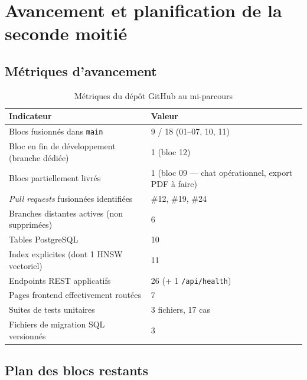 \documentclass[12pt, a4paper]{article}
\begin{document}
\section{Avancement et planification de la seconde moitié}

\subsection{Métriques d'avancement}

\begin{table}[H]
\centering
\caption{Métriques du dépôt GitHub au mi-parcours}
\begin{tabularx}{\textwidth}{lX}
\toprule
\textbf{Indicateur} & \textbf{Valeur} \\
\midrule
Blocs fusionnés dans \texttt{main} & 9 / 18 (01–07, 10, 11) \\
Bloc en fin de développement (branche dédiée) & 1 (bloc 12) \\
Blocs partiellement livrés & 1 (bloc 09 — chat opérationnel, export PDF à faire) \\
\textit{Pull requests} fusionnées identifiées & \#12, \#19, \#24 \\
Branches distantes actives (non supprimées) & 6 \\
Tables PostgreSQL & 10 \\
Index explicites (dont 1 HNSW vectoriel) & 11 \\
Endpoints REST applicatifs & 26 (+ 1 \texttt{/api/health}) \\
Pages frontend effectivement routées & 7 \\
Suites de tests unitaires & 3 fichiers, 17 cas \\
Fichiers de migration SQL versionnés & 3 \\
\bottomrule
\end{tabularx}
\end{table}

\subsection{Plan des blocs restants}
\end{document}
